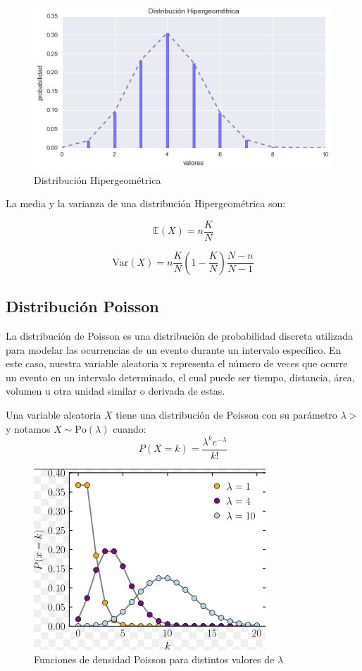 \documentclass{article}
\begin{document}
\begin{figure}[H]
    \centering
    \includegraphics[width=0.6\linewidth]{Imagenes/Distr.Hipergeometrica.png}
    \caption{Distribución Hipergeométrica}
    \label{fig:Distr.Hipergeometrica}
\end{figure}

La media y la varianza de una distribución Hipergeométrica son:

\begin{equation}
\mathbb{E}(X) = n \frac{K}{N}
\end{equation}

\begin{equation}
\mathrm{Var}(X) = n \frac{K}{N} \left(1 - \frac{K}{N}\right) \frac{N - n}{N - 1}
\end{equation}

\subsection{Distribución Poisson}
La distribución de Poisson es una distribución de probabilidad discreta utilizada para modelar las ocurrencias de un evento durante un intervalo específico. En este caso, nuestra variable aleatoria x representa el número de veces que ocurre un evento en un intervalo determinado, el cual puede ser tiempo, distancia, área, volumen u otra unidad similar o derivada de estas.

Una variable aleatoria \( X \) tiene una distribución de Poisson con su parámetro \( \lambda > \) y notamos \( X \sim \mathrm{Po}(\lambda) \) cuando: 
\begin{equation}
    P(X = k) = \frac{\lambda^k e^{-\lambda}}{k!}
\end{equation}

\begin{figure}[H]
    \centering
    \includegraphics[width=0.5\linewidth]{Imagenes/DistrPoisson.png}
    \caption{Funciones de densidad Poisson para distintos valores de $\lambda$}
    \label{fig:Distr.Poisson}
\end{figure}
 
\end{document}
